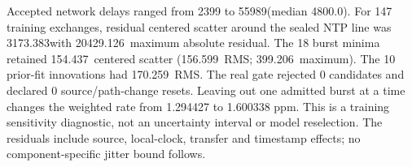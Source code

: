 Accepted network delays ranged from 2399 to 55989\us (median 4800.0\us). For 147 training exchanges, residual centered scatter around the sealed NTP line was 3173.383\us with 20429.126\us\ maximum absolute residual. The 18 burst minima retained 154.437\us\ centered scatter (156.599\us\ RMS; 399.206\us\ maximum). The 10 prior-fit innovations had 170.259\us\ RMS. The real gate rejected 0 candidates and declared 0 source/path-change resets. Leaving out one admitted burst at a time changes the weighted rate from 1.294427 to 1.600338 ppm. This is a training sensitivity diagnostic, not an uncertainty interval or model reselection. The residuals include source, local-clock, transfer and timestamp effects; no component-specific jitter bound follows.
